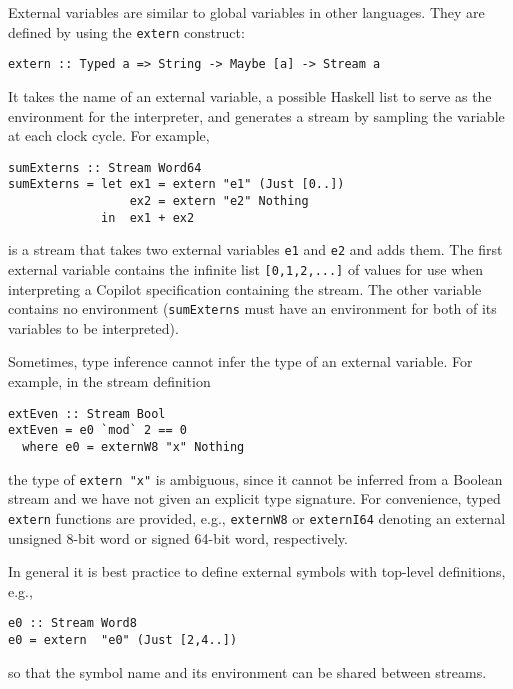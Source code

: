 External variables are similar to global variables in other languages. They
are defined by using the {\tt extern} construct:
%
\begin{lstlisting}[language = Copilot, frame = single]
extern :: Typed a => String -> Maybe [a] -> Stream a
\end{lstlisting}
%
\noindent
It takes the name of an external variable, a possible Haskell list to serve as
the environment for the interpreter, and generates a stream by sampling the
variable at each clock cycle.  For example,
%
\begin{lstlisting}[language = Copilot, frame = single]
sumExterns :: Stream Word64
sumExterns = let ex1 = extern "e1" (Just [0..])
                 ex2 = extern "e2" Nothing
             in  ex1 + ex2
\end{lstlisting}
%
is a stream that takes two external variables {\tt e1} and {\tt e2} and adds
them.  The first external variable contains the infinite list {\tt [0,1,2,...]}
of values for use when interpreting a Copilot specification containing the
stream.  The other variable contains no environment ({\tt sumExterns} must have
an environment for both of its variables to be interpreted).

Sometimes, type inference cannot infer the type of an external variable.  For
example, in the stream definition
%
\begin{lstlisting}[language = Copilot, frame = single]
extEven :: Stream Bool
extEven = e0 `mod` 2 == 0
  where e0 = externW8 "x" Nothing
\end{lstlisting}
%
\noindent
the type of {\tt extern "x"} is ambiguous, since it cannot be inferred from a
Boolean stream and we have not given an explicit type signature.  For
convenience, typed {\tt extern} functions are provided, e.g., {\tt externW8} or
{\tt externI64} denoting an external unsigned 8-bit word or signed 64-bit word,
respectively.

In general it is best practice to define external symbols with
top-level definitions, e.g.,
%
\begin{lstlisting}[language = Copilot, frame = single]
e0 :: Stream Word8
e0 = extern  "e0" (Just [2,4..])
\end{lstlisting}

\noindent
so that the symbol name and its environment can be shared between streams.

